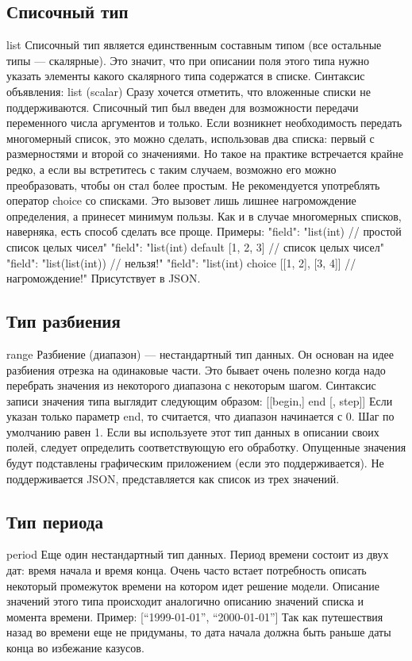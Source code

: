 {{\subsection{Списочный тип}
list
Списочный тип является единственным составным типом (все остальные типы — скалярные). Это значит, что при описании поля этого типа нужно указать элементы какого скалярного типа содержатся в списке. Синтаксис объявления:
        list (scalar)
Сразу хочется отметить, что вложенные списки не поддерживаются.
Списочный тип был введен для возможности передачи переменного числа аргументов и только. Если возникнет необходимость передать многомерный список, это можно сделать, использовав два списка: первый с размерностями и второй со значениями. Но такое на практике встречается крайне редко, а если вы встретитесь с таким случаем, возможно его можно преобразовать, чтобы он стал более простым.
Не рекомендуется употреблять оператор choice со списками. Это вызовет лишь лишнее нагромождение определения, а принесет минимум пользы. Как и в случае многомерных списков, наверняка, есть способ сделать все проще.
Примеры:
"field": "list(int) // простой список целых чисел"
"field": "list(int) default [1, 2, 3] // список целых чисел"
"field": "list(list(int)) // нельзя!"
"field": "list(int) choice [[1, 2], [3, 4]] // нагромождение!"
Присутствует в JSON.

\subsection{Тип разбиения}
range
Разбиение (диапазон) — нестандартный тип данных. Он основан на идее разбиения отрезка на одинаковые части. Это бывает очень полезно когда надо перебрать значения из некоторого диапазона с некоторым шагом.
Синтаксис записи значения типа выглядит следующим образом:
        [[begin,] end [, step]]
Если указан только параметр end, то считается, что диапазон начинается с 0. Шаг по умолчанию равен 1. Если вы используете этот тип данных в описании своих полей, следует определить соответствующую его обработку. Опущенные значения будут подставлены графическим приложением (если это поддерживается).
Не поддерживается JSON, представляется как список из трех значений.

\subsection{Тип периода}
period
Еще один нестандартный тип данных. Период времени состоит из двух дат: время начала и время конца. Очень часто встает потребность описать некоторый промежуток времени на котором идет решение модели. Описание значений этого типа происходит аналогично описанию значений списка и момента времени. Пример:
        [“1999-01-01”, “2000-01-01”]
Так как путешествия назад во времени еще не придуманы, то дата начала должна быть раньше даты конца во избежание казусов.

}}
